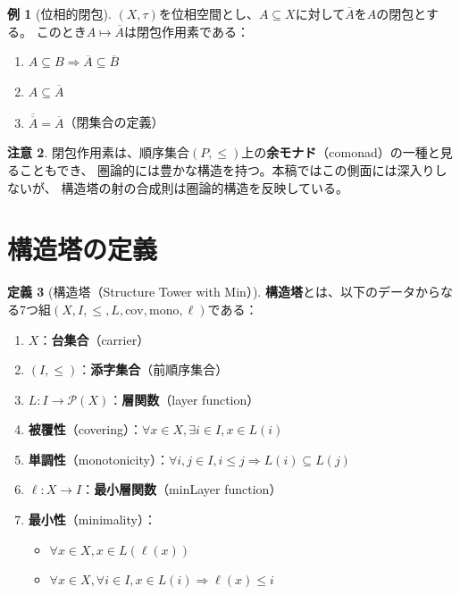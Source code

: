 \documentclass[a4paper,12pt]{ltjsarticle}
\theoremstyle{definition}
\newtheorem{definition}{定義}[section]
\newtheorem{example}[definition]{例}
\newtheorem{remark}[definition]{注意}
\begin{document}
\begin{example}[位相的閉包]
$(X, \tau)$を位相空間とし、$A \subseteq X$に対して$\overline{A}$を$A$の閉包とする。
このとき$A \mapsto \overline{A}$は閉包作用素である：
\begin{enumerate}[label=(\roman*)]
\item $A \subseteq B \Rightarrow \overline{A} \subseteq \overline{B}$
\item $A \subseteq \overline{A}$
\item $\overline{\overline{A}} = \overline{A}$（閉集合の定義）
\end{enumerate}
\end{example}

\begin{remark}
閉包作用素は、順序集合$(P, \leq)$上の\textbf{余モナド}（comonad）の一種と見ることもでき、
圏論的には豊かな構造を持つ。本稿ではこの側面には深入りしないが、
構造塔の射の合成則は圏論的構造を反映している。
\end{remark}

\section{構造塔の定義}

\begin{definition}[構造塔（Structure Tower with Min）]\label{def:tower}
\textbf{構造塔}とは、以下のデータからなる7つ組$(X, I, \leq, L, \mathrm{cov}, \mathrm{mono}, \ell)$である：

\begin{enumerate}
\item $X$：\textbf{台集合}（carrier）
\item $(I, \leq)$：\textbf{添字集合}（前順序集合）
\item $L: I \to \mathcal{P}(X)$：\textbf{層関数}（layer function）
\item \textbf{被覆性}（covering）：$\forall x \in X, \exists i \in I, x \in L(i)$
\item \textbf{単調性}（monotonicity）：$\forall i, j \in I, i \leq j \Rightarrow L(i) \subseteq L(j)$
\item $\ell: X \to I$：\textbf{最小層関数}（minLayer function）
\item \textbf{最小性}（minimality）：
  \begin{itemize}
  \item $\forall x \in X, x \in L(\ell(x))$
  \item $\forall x \in X, \forall i \in I, x \in L(i) \Rightarrow \ell(x) \leq i$
  \end{itemize}
\end{enumerate}
\end{definition}
\end{document}

